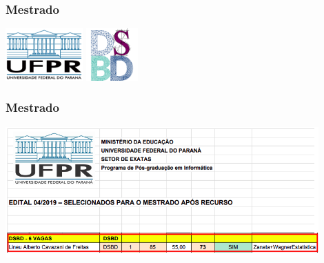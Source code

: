 \documentclass[10pt,
  aspectratio=169,
  serif,
  mathserif,
  professionalfont,
  compress,
  handout,
  ]{beamer}\usepackage[]{graphicx}\usepackage[]{color}
\begin{document}
\begin{frame}

\frametitle{Mestrado}

\begin{center}
  \includegraphics[height=2cm]{img/ufpr-transparent.png}\hspace{2em}
  \includegraphics[height=2cm]{img/dsbd-2x2-trans.png}
\end{center}

\end{frame}


\begin{frame}

\frametitle{Mestrado}

\begin{center}
  \includegraphics[height=5cm]{img/mestrado.png}
\end{center}

\end{frame}

\end{document}
